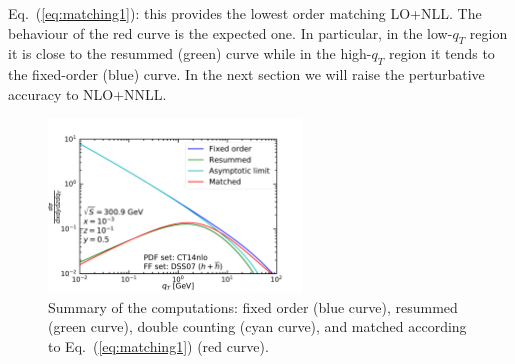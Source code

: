 \documentclass[10pt,a4paper]{article}
\begin{document}
Eq.~(\ref{eq:matching1}): this provides the lowest order matching
LO+NLL. The behaviour of the red curve is the expected one. In
particular, in the low-$q_T$ region it is close to the resummed
(green) curve while in the high-$q_T$ region it tends to the
fixed-order (blue) curve. In the next section we will raise the
perturbative accuracy to NLO+NNLL.
\begin{figure}[t]
  \begin{centering}
    \includegraphics[width=0.6\textwidth]{plots/FONLL}
    \caption{Summary of the computations: fixed order (blue curve),
      resummed (green curve), double counting (cyan curve), and
      matched according to Eq.~(\ref{eq:matching1}) (red
      curve).\label{fig:FONLL}}
  \end{centering}
\end{figure}

\end{document}
